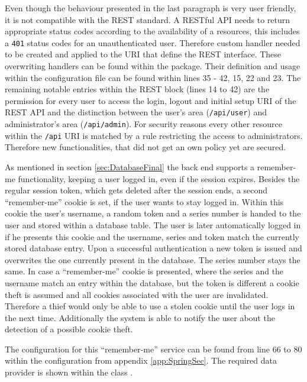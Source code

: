 Even though the behaviour presented in the last paragraph is very user friendly, it is not compatible with the \gls{REST} standard. A \gls{REST}ful \gls{API} needs to return appropriate status codes according to the availability of a resources, this includes a \texttt{401} status codes for an unauthenticated user. Therefore custom handler needed to be created and applied to the \gls{URI} that define the \gls{REST} interface. These overwriting handlers can be found within the  package. Their definition and usage within the configuration file can be found within lines 35 - 42, 15, 22 and 23. The remaining notable entries within the \gls{REST} block (lines 14 to 42) are the permission for every user to access the login, logout and initial setup \gls{URI} of the \gls{REST} \gls{API} and the distinction between the user's area (\texttt{/api/user}) and administrator's area (\texttt{/api/admin}). For security reasons every other resource within the \texttt{/api} \gls{URI} is matched by a rule restricting the access to administrators. Therefore new functionalities, that did not get an own policy yet are secured.

As mentioned in section \vref{sec:DatabaseFinal} the back end supports a remember-me functionality, keeping a user logged in, even if the session expires. Besides the regular session token, which gets deleted after the session ends, a second \enquote{remember-me} cookie is set, if the user wants to stay logged in. Within this cookie the user's username, a random token and a series number is handed to the user and stored within a database table. The user is later automatically logged in if he presents this cookie and the username, series and token match the currently stored database entry. Upon a successful authentication a new token is issued and overwrites the one currently present in the database. The series number stays the same. In case a \enquote{remember-me} cookie is presented, where the series and the username match an entry within the database, but the token is different a cookie theft is assumed and all cookies associated with the user are invalidated. Therefore a thief would only be able to use a stolen cookie until the user logs in the next time. Additionally the system is able to notify the user about the detection of a possible cookie theft. \cite{Jaspan:2006aa}

The configuration for this \enquote{remember-me} service can be found from line 66 to 80 within the configuration from appendix \vref{app:SpringSec}. The required data provider is shown within the class .

